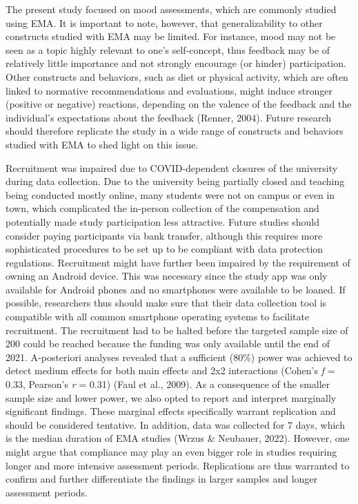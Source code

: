 \documentclass[authordate, empirical]{jote-new-article}
\begin{document}
	The present study focused on mood assessments, which are commonly studied using EMA. It is important to note, however, that generalizability to other constructs studied with EMA may be limited. For instance, mood may not be seen as a topic highly relevant to one's self-concept, thus feedback may be of relatively little importance and not strongly encourage (or hinder) participation. Other constructs and behaviors, such as diet or physical activity, which are often linked to normative recommendations and evaluations, might induce stronger (positive or negative) reactions, depending on the valence of the feedback and the individual's expectations about the feedback (Renner, 2004). Future research should therefore replicate the study in a wide range of constructs and behaviors studied with EMA to shed light on this issue.



	Recruitment was impaired due to COVID-dependent closures of the university during data collection. Due to the university being partially closed and teaching being conducted mostly online, many students were not on campus or even in town, which complicated the in-person collection of the compensation and potentially made study participation less attractive. Future studies should consider paying participants via bank transfer, although this requires more sophisticated procedures to be set up to be compliant with data protection regulations. Recruitment might have further been impaired by the requirement of owning an Android device. This was necessary since the study app was only available for Android phones and no smartphones were available to be loaned. If possible, researchers thus should make sure that their data collection tool is compatible with all common smartphone operating systems to facilitate recruitment. The recruitment had to be halted before the targeted sample size of 200 could be reached because the funding was only available until the end of 2021. A-posteriori analyses revealed that a sufficient (80\%) power was achieved to detect medium effects for both main effects and 2x2 interactions (Cohen's \emph{f} = 0.33, Pearson's \emph{r} = 0.31) (Faul et al., 2009). As a consequence of the smaller sample size and lower power, we also opted to report and interpret marginally significant findings. These marginal effects specifically warrant replication and should be considered tentative. In addition, data was collected for 7 days, which is the median duration of EMA studies (Wrzus \& Neubauer, 2022). However, one might argue that compliance may play an even bigger role in studies requiring longer and more intensive assessment periods. Replications are thus warranted to confirm and further differentiate the findings in larger samples and longer assessment periods.
\end{document}

